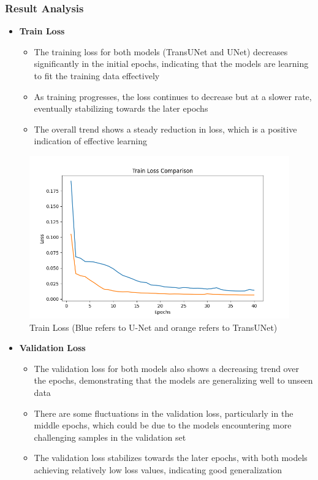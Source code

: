 \documentclass[11pt,a4paper]{article}
\begin{document}
\subsubsection{Result Analysis}
\begin{itemize}
    \item \textbf{Train Loss}
    \begin{itemize}
        \item The training loss for both models (TransUNet and UNet) decreases significantly in the initial epochs, indicating that the models are learning to fit the training data effectively
        \item As training progresses, the loss continues to decrease but at a slower rate, eventually stabilizing towards the later epochs
        \item The overall trend shows a steady reduction in loss, which is a positive indication of effective learning 
    \end{itemize}
\end{itemize}
\begin{figure}[H]
    \centering
    \includegraphics[width= 0.9\linewidth]{train_loss.png}
    \caption{Train Loss (Blue refers to U-Net and orange refers to TransUNet)}
    
\end{figure}
\pagebreak
\begin{itemize}
    \item \textbf{Validation Loss}
    \begin{itemize}
        \item The validation loss for both models also shows a decreasing trend over the epochs, demonstrating that the models are generalizing well to unseen data
        \item There are some fluctuations in the validation loss, particularly in the middle epochs, which could be due to the models encountering more challenging samples in the validation set
        \item The validation loss stabilizes towards the later epochs, with both models achieving relatively low loss values, indicating good generalization
    \end{itemize}
\end{itemize}
\end{document}
